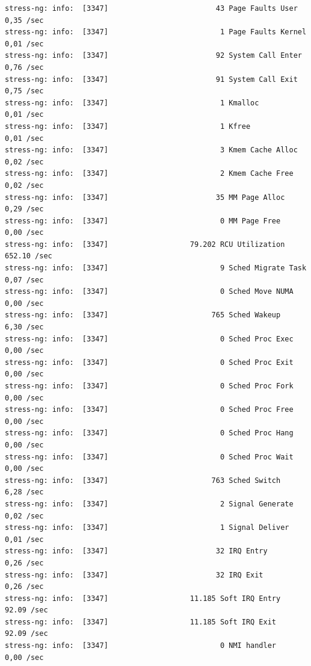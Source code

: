 \documentclass[12pt,onecolumn]{article}
\begin{document}
{\begin{lstlisting}
stress-ng: info:  [3347]                         43 Page Faults User                0,35 /sec 
stress-ng: info:  [3347]                          1 Page Faults Kernel              0,01 /sec 
stress-ng: info:  [3347]                         92 System Call Enter               0,76 /sec 
stress-ng: info:  [3347]                         91 System Call Exit                0,75 /sec 
stress-ng: info:  [3347]                          1 Kmalloc                         0,01 /sec 
stress-ng: info:  [3347]                          1 Kfree                           0,01 /sec 
stress-ng: info:  [3347]                          3 Kmem Cache Alloc                0,02 /sec 
stress-ng: info:  [3347]                          2 Kmem Cache Free                 0,02 /sec 
stress-ng: info:  [3347]                         35 MM Page Alloc                   0,29 /sec 
stress-ng: info:  [3347]                          0 MM Page Free                    0,00 /sec 
stress-ng: info:  [3347]                   79.202 RCU Utilization               652.10 /sec 
stress-ng: info:  [3347]                          9 Sched Migrate Task              0,07 /sec 
stress-ng: info:  [3347]                          0 Sched Move NUMA                 0,00 /sec 
stress-ng: info:  [3347]                        765 Sched Wakeup                    6,30 /sec 
stress-ng: info:  [3347]                          0 Sched Proc Exec                 0,00 /sec 
stress-ng: info:  [3347]                          0 Sched Proc Exit                 0,00 /sec 
stress-ng: info:  [3347]                          0 Sched Proc Fork                 0,00 /sec 
stress-ng: info:  [3347]                          0 Sched Proc Free                 0,00 /sec 
stress-ng: info:  [3347]                          0 Sched Proc Hang                 0,00 /sec 
stress-ng: info:  [3347]                          0 Sched Proc Wait                 0,00 /sec 
stress-ng: info:  [3347]                        763 Sched Switch                    6,28 /sec 
stress-ng: info:  [3347]                          2 Signal Generate                 0,02 /sec 
stress-ng: info:  [3347]                          1 Signal Deliver                  0,01 /sec 
stress-ng: info:  [3347]                         32 IRQ Entry                       0,26 /sec 
stress-ng: info:  [3347]                         32 IRQ Exit                        0,26 /sec 
stress-ng: info:  [3347]                   11.185 Soft IRQ Entry                 92.09 /sec 
stress-ng: info:  [3347]                   11.185 Soft IRQ Exit                  92.09 /sec 
stress-ng: info:  [3347]                          0 NMI handler                     0,00 /sec 

\end{lstlisting}}
\end{document}
